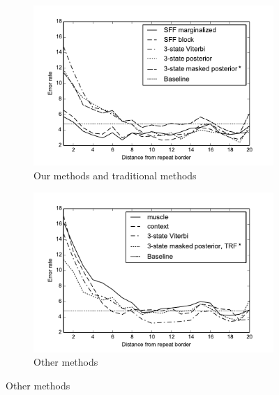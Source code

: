 \begin{figure}
\begin{center}
\begin{subfigure}{0.5\textwidth}
\includegraphics[width=\textwidth]{../figures/error_graph_overview.pdf}
\caption{Our methods and traditional methods}\label{FIGURE:SFFOVER}
\end{subfigure}%
\begin{subfigure}{0.5\textwidth}
\includegraphics[width=\textwidth]{../figures/error_graph_other.pdf}
\caption{Other methods}\label{FIGURE:SFFOTHER}
\end{subfigure}%


\end{center}
\end{figure}
